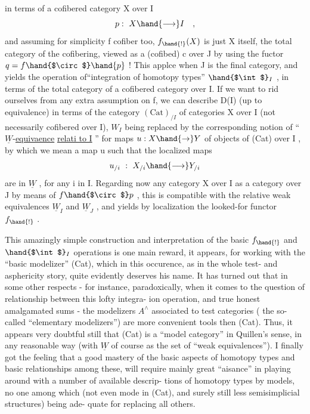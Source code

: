 
in terms of a cofibered category X over I
\[ p:\ X \hand{\longrightarrow} I \quad , \]
and assuming for simplicity f cofiber too, $f_{\hand{!}}(X)$ is just X itself,
the total category of the cofibering, viewed as a (cofibed) c
over J by using the fuctor $q = f\hand{$\circ$}\hand{p}$ ! This applce when J
is the final category, and yields the operation of``integration of
homotopy types'' $\hand{$\int$}_I$ , in terms of the total category of a  cofibered
category over I. If we want to rid ourselves from any extra assumption
on f, we can describe D(I) (up to equivalence) in terms of the category
$(\mathrm{Cat})_{/I}$ of categories X over I (not necessarily cofibered over I), $W_I$
being replaced by the corresponding notion of ``$\underline{W}$-\uline{equivaence}  \uline{relati
to I} '' for maps $u : X \hand{\to} Y$ of objects of (Cat) over I , by which we mean
a map u such that the localized maps
\[ u_{/i} \ :\ X_{/i} \hand{\longrightarrow} Y_{/i} \]
are in $\underline{W}$ , for any i in I. Regarding now any category X over I as a
category over J by means of $f\hand{$\circ$}p$ , this is  compatible with the relative
weak equivalences $\underline{W}_I$ and $\underline{W}_J$ , and yields by localization the looked-for
functor $f_{\hand{!}}$ .

This amazingly simple construction and interpretation of the basic
$f_{\hand{!}}$ and $\hand{$\int$}_I$ operations is one main reward, it appears, for working with
the ``basic modelizer'' (Cat), which in this occurence, as in the whole
test- and asphericity story, quite evidently deserves his name. It has
turned out  that in some other respects - for instance, paradoxically,
when it comes to the question of relationship between this lofty integra-%
ion operation, and true honest amalgamated sums - the modelizers $A^{\wedge}$
associated to test categories  ( the so-called ``elementary modelizers'') are
more convenient tools then (Cat). Thus, it appears very doubtful still
that (Cat) is a ``model category'' in Quillen's sense, in any reasonable
way (with $\underline{W}$ of course as the set of ``weak equivalences''). I finally got
the feeling that  a good mastery of the basic aspects of homotopy types
and   basic relationships among these, will require mainly
great ``aisance'' in playing  around with a number of available descrip-%
tions of homotopy types by models, no one among which (not even  mode
in (Cat), and surely  still less  semisimplicial structures) being ade-%
quate for replacing all others.

